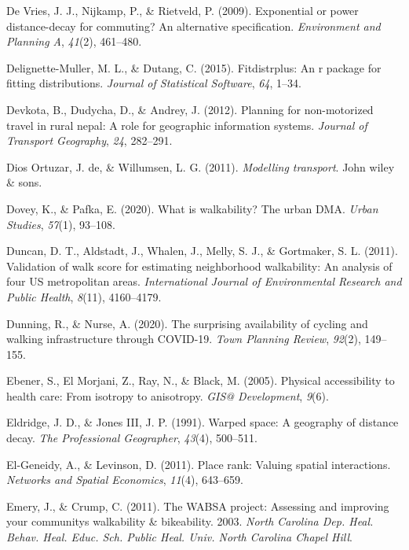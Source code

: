 \documentclass[
11pt, %
oneside, %
english, %
singlespacing, %
]{macthesis} %
\newlength{\cslhangindent}
\newenvironment{CSLReferences}[2] %
 {%
  \setlength{\parindent}{0pt}
  \ifodd #1 \everypar{\setlength{\hangindent}{\cslhangindent}}\ignorespaces\fi
  \ifnum #2 > 0
  \setlength{\parskip}{#2\baselineskip}
  \fi
 }%
 {}
\begin{document}
\begin{CSLReferences}{1}{0}
De Vries, J. J., Nijkamp, P., \& Rietveld, P. (2009). Exponential or power distance-decay for commuting? An alternative specification. \emph{Environment and Planning A}, \emph{41}(2), 461--480.

Delignette-Muller, M. L., \& Dutang, C. (2015). Fitdistrplus: An r package for fitting distributions. \emph{Journal of Statistical Software}, \emph{64}, 1--34.

Devkota, B., Dudycha, D., \& Andrey, J. (2012). Planning for non-motorized travel in rural nepal: A role for geographic information systems. \emph{Journal of Transport Geography}, \emph{24}, 282--291.

Dios Ortuzar, J. de, \& Willumsen, L. G. (2011). \emph{Modelling transport}. John wiley \& sons.

Dovey, K., \& Pafka, E. (2020). What is walkability? The urban DMA. \emph{Urban Studies}, \emph{57}(1), 93--108.

Duncan, D. T., Aldstadt, J., Whalen, J., Melly, S. J., \& Gortmaker, S. L. (2011). Validation of walk score for estimating neighborhood walkability: An analysis of four US metropolitan areas. \emph{International Journal of Environmental Research and Public Health}, \emph{8}(11), 4160--4179.

Dunning, R., \& Nurse, A. (2020). The surprising availability of cycling and walking infrastructure through COVID-19. \emph{Town Planning Review}, \emph{92}(2), 149--155.

Ebener, S., El Morjani, Z., Ray, N., \& Black, M. (2005). Physical accessibility to health care: From isotropy to anisotropy. \emph{GIS@ Development}, \emph{9}(6).

Eldridge, J. D., \& Jones III, J. P. (1991). Warped space: A geography of distance decay. \emph{The Professional Geographer}, \emph{43}(4), 500--511.

El-Geneidy, A., \& Levinson, D. (2011). Place rank: Valuing spatial interactions. \emph{Networks and Spatial Economics}, \emph{11}(4), 643--659.

Emery, J., \& Crump, C. (2011). The WABSA project: Assessing and improving your communitys walkability \& bikeability. 2003. \emph{North Carolina Dep. Heal. Behav. Heal. Educ. Sch. Public Heal. Univ. North Carolina Chapel Hill}.


\end{CSLReferences}
\end{document}
